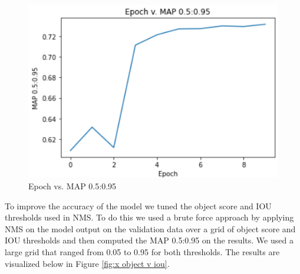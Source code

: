 \documentclass{article}
\begin{document}
\begin{enumerate}
\begin{figure}[h]
\centering
	\includegraphics[scale=0.7]{final-report-images/epoch_v_map.png}
\caption{Epoch vs. MAP 0.5:0.95}
\label{fig:x epoch_v_map}
\end{figure}

To improve the accuracy of the model we tuned the object score and IOU thresholds used in NMS.  To do this we used a brute force approach by applying NMS on the model output on the validation data over a grid of object score and IOU thresholds and then computed the MAP 0.5:0.95 on the results.  We used a large grid that ranged from 0.05 to 0.95 for both thresholds.  The results are visualized below in Figure \ref{fig:x object v iou}.  


\end{enumerate}
\end{document}
